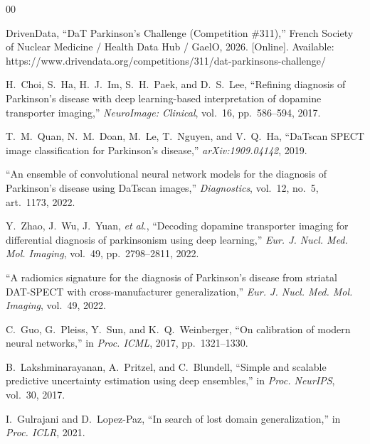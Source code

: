 \documentclass{article}
\begin{document}

\begin{thebibliography}{00}

 DrivenData, ``DaT Parkinson's Challenge (Competition \#311),'' French Society of Nuclear Medicine / Health Data Hub / GaelO, 2026. [Online]. Available: https://www.drivendata.org/competitions/311/dat-parkinsons-challenge/

 H.~Choi, S.~Ha, H.~J.~Im, S.~H.~Paek, and D.~S.~Lee, ``Refining diagnosis of Parkinson's disease with deep learning-based interpretation of dopamine transporter imaging,'' \emph{NeuroImage: Clinical}, vol.~16, pp.~586--594, 2017.

 T.~M.~Quan, N.~M.~Doan, M.~Le, T.~Nguyen, and V.~Q.~Ha, ``DaTscan SPECT image classification for Parkinson's disease,'' \emph{arXiv:1909.04142}, 2019.

 ``An ensemble of convolutional neural network models for the diagnosis of Parkinson's disease using DaTscan images,'' \emph{Diagnostics}, vol.~12, no.~5, art.~1173, 2022.

 Y.~Zhao, J.~Wu, J.~Yuan, \emph{et al.}, ``Decoding dopamine transporter imaging for differential diagnosis of parkinsonism using deep learning,'' \emph{Eur. J. Nucl. Med. Mol. Imaging}, vol.~49, pp.~2798--2811, 2022.

 ``A radiomics signature for the diagnosis of Parkinson's disease from striatal DAT-SPECT with cross-manufacturer generalization,'' \emph{Eur. J. Nucl. Med. Mol. Imaging}, vol.~49, 2022.

 C.~Guo, G.~Pleiss, Y.~Sun, and K.~Q.~Weinberger, ``On calibration of modern neural networks,'' in \emph{Proc. ICML}, 2017, pp.~1321--1330.

 B.~Lakshminarayanan, A.~Pritzel, and C.~Blundell, ``Simple and scalable predictive uncertainty estimation using deep ensembles,'' in \emph{Proc. NeurIPS}, vol.~30, 2017.

 I.~Gulrajani and D.~Lopez-Paz, ``In search of lost domain generalization,'' in \emph{Proc. ICLR}, 2021.

\end{thebibliography}
\end{document}
